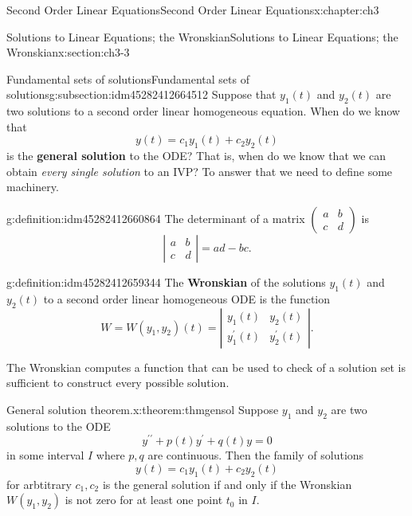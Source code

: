 \documentclass[oneside,10pt,]{book}
\newcommand{\terminology}[1]{\textbf{#1}}
\numberwithin{equation}{section}
\numberwithin{equation}{section}
\newcommand{\amp}{&}
\begin{document}
\begin{chapterptx}{Second Order Linear Equations}{}{Second Order Linear Equations}{}{}{x:chapter:ch3}
\begin{sectionptx}{Solutions to Linear Equations; the Wronskian}{}{Solutions to Linear Equations; the Wronskian}{}{}{x:section:ch3-3}
\begin{subsectionptx}{Fundamental sets of solutions}{}{Fundamental sets of solutions}{}{}{g:subsection:idm45282412664512}
Suppose that \(y_{1}(t)\) and \(y_{2}(t)\) are two solutions to a second order linear homogeneous equation. When do we know that%
\begin{equation*}
y(t)=c_{1}y_{1}(t)+c_{2}y_{2}(t)
\end{equation*}
is the \terminology{general solution} to the ODE? That is, when do we know that we can obtain \emph{every single solution} to an IVP? To answer that we need to define some machinery.%
\begin{definition}{}{g:definition:idm45282412660864}%
The determinant of a matrix \(\left(\begin{array}{cc}
a \amp b\\
c \amp d
\end{array}\right)\) is%
\begin{equation*}
\left|\begin{array}{cc}
a \amp b\\
c \amp d
\end{array}\right|=ad-bc.
\end{equation*}
\end{definition}
\begin{definition}{}{g:definition:idm45282412659344}%
The \terminology{Wronskian} of the solutions \(y_{1}(t)\) and \(y_{2}(t)\) to a second order linear homogeneous ODE is the function%
\begin{equation*}
W=W(y_{1},y_{2})(t)=\left|\begin{array}{cc}
y_{1}(t) \amp y_{2}(t)\\
y_{1}^{\prime}(t) \amp y_{2}^{\prime}(t)
\end{array}\right|.
\end{equation*}
\end{definition}
The Wronskian computes a function that can be used to check of a solution set is sufficient to construct every possible solution.%
\begin{theorem}{General solution theorem.}{}{x:theorem:thmgensol}%
Suppose \(y_{1}\) and \(y_{2}\) are two solutions to the ODE%
\begin{equation*}
y^{\prime\prime}+p(t)y^{\prime}+q(t)y=0
\end{equation*}
in some interval \(I\) where \(p,q\) are continuous. Then the family of solutions%
\begin{equation*}
y(t)=c_{1}y_{1}(t)+c_{2}y_{2}(t)
\end{equation*}
for arbtitrary \(c_{1},c_{2}\) is the general solution if and only if the Wronskian \(W\left(y_{1},y_{2}\right)\) is not zero for at least one point \(t_{0}\) in \(I\).%

\end{theorem}
\end{subsectionptx}
\end{sectionptx}
\end{chapterptx}
\end{document}
